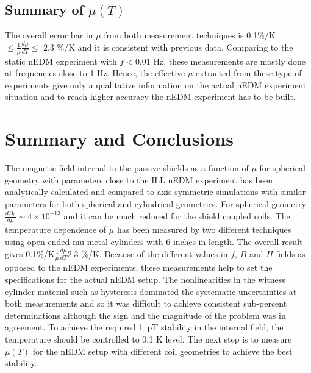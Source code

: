 \documentclass[review]{elsarticle}
\begin{document}

\subsection{Summary of $\mu(T)$}
The overall error bar in $\mu$ from both measurement techniques is 0.1\%/K $\leq \frac{1}{\mu}\frac{d\mu}{dT} \leq$ 2.3 \%/K and it is consistent with previous data.
Comparing to the static nEDM experiment with $f < 0.01$ Hz, these measurements are mostly done at frequencies close to 1 Hz. Hence, the effective $\mu$ extracted from these type of experiments give
only a qualitative information on the actual nEDM experiment situation and to reach higher accuracy the nEDM experiment has to be built. 
\section{Summary and Conclusions}
The magnetic field internal to the passive shields as a function of $\mu$ for spherical geometry with parameters close to the ILL nEDM experiment has been analytically calculated and compared to axis-symmetric simulations with similar parameters for both spherical and cylindrical geometries. For spherical geometry $\frac{dB_0}{d\mu}\sim 4 \times 10^{-13}$ and it can be much reduced for the shield coupled coils.
The temperature dependence of $\mu$ has been measured by two different techniques using open-ended mu-metal cylinders with 6 inches in length. The overall result gives 0.1\%/K$\frac{1}{\mu}\frac{d\mu}{dT}$2.3 \%/K. Because of the different values in $f$, $B$ and $H$ fields as opposed to the nEDM experiments, these  measurements help to set the specifications for the actual nEDM setup. The nonlinearities in the witness cylinder material such as hysteresis dominated the systematic uncertainties at both measurements and so it was difficult to achieve consistent sub-percent determinations although the sign and the magnitude of the problem was in agreement.
To achieve the required 1~pT stability in the internal field, the temperature should be controlled to 0.1 K level.
The next step is to measure $\mu(T)$ for the nEDM setup with different coil geometries to achieve the best stability.
\end{document}
